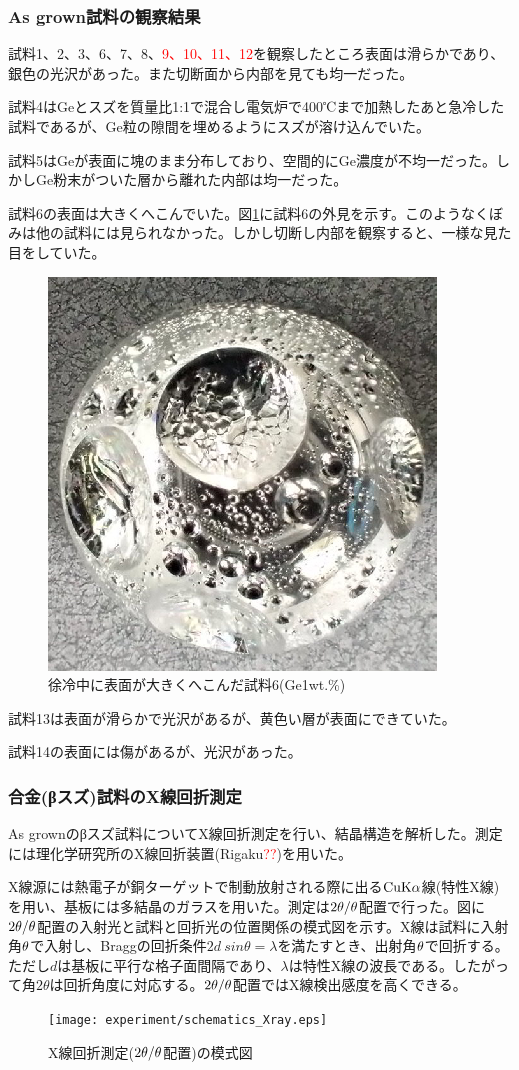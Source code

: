\subsubsection{As grown試料の観察結果}
試料1、2、3、6、7、8、\textcolor{red}{9、10、11、12}を観察したところ表面は滑らかであり、銀色の光沢があった。また切断面から内部を見ても均一だった。

試料4はGeとスズを質量比1:1で混合し電気炉で400℃まで加熱したあと急冷した試料であるが、Ge粒の隙間を埋めるようにスズが溶け込んでいた。

試料5はGeが表面に塊のまま分布しており、空間的にGe濃度が不均一だった。しかしGe粉末がついた層から離れた内部は均一だった。

試料6の表面は大きくへこんでいた。図\ref{fig:sample6_asgrown}に試料6の外見を示す。このようなくぼみは他の試料には見られなかった。しかし切断し内部を観察すると、一様な見た目をしていた。
\begin{figure}[!h]
    \begin{center}
   \includegraphics[width=0.4\hsize]{samples/sample6_asgrown.eps}
  \end{center}
  \caption{徐冷中に表面が大きくへこんだ試料6(Ge1wt.\%)}
  \label{fig:sample6_asgrown}
\end{figure}

試料13は表面が滑らかで光沢があるが、黄色い層が表面にできていた。

試料14の表面には傷があるが、光沢があった。


\subsubsection{合金(βスズ)試料のX線回折測定}
As grownのβスズ試料についてX線回折測定を行い、結晶構造を解析した。測定には理化学研究所のX線回折装置(Rigaku\textcolor{red}{??})を用いた。

X線源には熱電子が銅ターゲットで制動放射される際に出る$\rm CuK\alpha$線(特性X線)を用い、基板には多結晶のガラスを用いた。測定は$\rm 2\theta/\theta$配置で行った。図に$\rm 2\theta/\theta$配置の入射光と試料と回折光の位置関係の模式図を示す。X線は試料に入射角$\rm \theta$で入射し、Braggの回折条件$2d\:sin\theta=\lambda$を満たすとき、出射角$\rm \theta$で回折する。ただし$d$は基板に平行な格子面間隔であり、$\lambda$は特性X線の波長である。したがって角$2\theta$は回折角度に対応する。$\rm 2\theta/\theta$配置ではX線検出感度を高くできる。
\begin{figure}[!h]
    \begin{center}
   \texttt{[image: experiment/schematics\_Xray.eps]}
  \end{center}
  \caption{X線回折測定($\rm 2\theta/\theta$配置)の模式図}
  \label{fig:schematics_Xray}
\end{figure}

